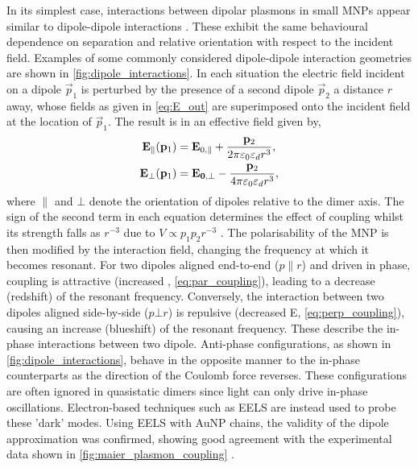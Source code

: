 \documentclass{article}
\begin{document}
In its simplest case, interactions between dipolar plasmons in small MNPs appear similar to dipole-dipole interactions \cite{kreibig1995optical, maier2002, gluodenis2002, rechberger2003, atay2004}. These exhibit the same behavioural dependence on separation and relative orientation with respect to the incident field. Examples of some commonly considered dipole-dipole interaction geometries are shown in \autoref{fig:dipole_interactions}. In each situation the electric field incident on a dipole $\vec{p}_1$ is perturbed by the presence of a second dipole $\vec{p}_2$ a distance $r$ away, whose fields as given in \eqref{eq:E_out} are superimposed onto the incident field at the location of $\vec{p}_1$. The result is in an effective field given by,
\begin{subequations}
\begin{align}
	\mathbf{E}_{\parallel}(\mathbf{p}_1) &= \mathbf{E}_{0,\parallel} + \frac{\mathbf{p}_2}{2\pi\varepsilon_0\varepsilon_d r^3}, \label{eq:par_coupling} \\
	\mathbf{E}_{\bot}(\mathbf{p}_1) &= \mathbf{E_{0,\bot}} - \frac{\mathbf{p}_2}{4\pi\varepsilon_0\varepsilon_d r^3}, \label{eq:perp_coupling}
\end{align}
\end{subequations}
where $\parallel$ and $\bot$ denote the orientation of dipoles relative to the dimer axis. The sign of the second term in each equation determines the effect of coupling whilst its strength falls as $r^{-3}$ due to $V \propto p_1p_2r^{-3}$ \cite{halas2011}. The polarisability of the MNP is then modified by the interaction field, changing the frequency at which it becomes resonant.
For two dipoles aligned end-to-end ($p \parallel r$) and driven in phase, coupling is attractive (increased , \eqref{eq:par_coupling}), leading to a decrease (redshift) of the resonant frequency. Conversely, the interaction between two dipoles aligned side-by-side ($p \bot r$) is repulsive (decreased E, \eqref{eq:perp_coupling}), causing an increase (blueshift) of the resonant frequency. These describe the in-phase interactions between two dipole. Anti-phase configurations, as shown in \autoref{fig:dipole_interactions}, behave in the opposite manner to the in-phase counterparts as the direction of the Coulomb force reverses. These configurations are often ignored in quasistatic dimers since light can only drive in-phase oscillations. Electron-based techniques such as EELS are instead used to probe these 'dark' modes. Using EELS with AuNP chains, the validity of the dipole approximation was confirmed, showing good agreement with the experimental data shown in \autoref{fig:maier_plasmon_coupling} \cite{maier2002}.
\end{document}
